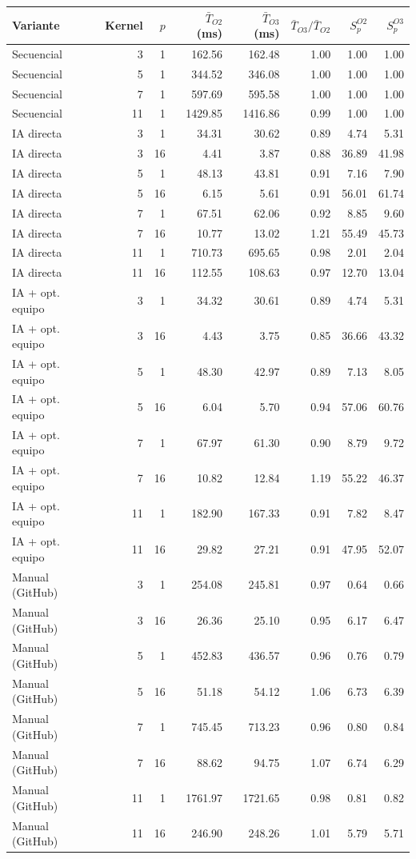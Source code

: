 \begin{tabular}{lrrrrrrr}
\toprule
Variante & Kernel & $p$ & $\bar{T}_{O2}$ (ms) & $\bar{T}_{O3}$ (ms) & $\bar{T}_{O3}/\bar{T}_{O2}$ & $S_p^{O2}$ & $S_p^{O3}$ \\
\midrule
Secuencial & 3 & 1 & 162.56 & 162.48 & 1.00 & 1.00 & 1.00 \\
Secuencial & 5 & 1 & 344.52 & 346.08 & 1.00 & 1.00 & 1.00 \\
Secuencial & 7 & 1 & 597.69 & 595.58 & 1.00 & 1.00 & 1.00 \\
Secuencial & 11 & 1 & 1429.85 & 1416.86 & 0.99 & 1.00 & 1.00 \\
IA directa & 3 & 1 & 34.31 & 30.62 & 0.89 & 4.74 & 5.31 \\
IA directa & 3 & 16 & 4.41 & 3.87 & 0.88 & 36.89 & 41.98 \\
IA directa & 5 & 1 & 48.13 & 43.81 & 0.91 & 7.16 & 7.90 \\
IA directa & 5 & 16 & 6.15 & 5.61 & 0.91 & 56.01 & 61.74 \\
IA directa & 7 & 1 & 67.51 & 62.06 & 0.92 & 8.85 & 9.60 \\
IA directa & 7 & 16 & 10.77 & 13.02 & 1.21 & 55.49 & 45.73 \\
IA directa & 11 & 1 & 710.73 & 695.65 & 0.98 & 2.01 & 2.04 \\
IA directa & 11 & 16 & 112.55 & 108.63 & 0.97 & 12.70 & 13.04 \\
IA + opt. equipo & 3 & 1 & 34.32 & 30.61 & 0.89 & 4.74 & 5.31 \\
IA + opt. equipo & 3 & 16 & 4.43 & 3.75 & 0.85 & 36.66 & 43.32 \\
IA + opt. equipo & 5 & 1 & 48.30 & 42.97 & 0.89 & 7.13 & 8.05 \\
IA + opt. equipo & 5 & 16 & 6.04 & 5.70 & 0.94 & 57.06 & 60.76 \\
IA + opt. equipo & 7 & 1 & 67.97 & 61.30 & 0.90 & 8.79 & 9.72 \\
IA + opt. equipo & 7 & 16 & 10.82 & 12.84 & 1.19 & 55.22 & 46.37 \\
IA + opt. equipo & 11 & 1 & 182.90 & 167.33 & 0.91 & 7.82 & 8.47 \\
IA + opt. equipo & 11 & 16 & 29.82 & 27.21 & 0.91 & 47.95 & 52.07 \\
Manual (GitHub) & 3 & 1 & 254.08 & 245.81 & 0.97 & 0.64 & 0.66 \\
Manual (GitHub) & 3 & 16 & 26.36 & 25.10 & 0.95 & 6.17 & 6.47 \\
Manual (GitHub) & 5 & 1 & 452.83 & 436.57 & 0.96 & 0.76 & 0.79 \\
Manual (GitHub) & 5 & 16 & 51.18 & 54.12 & 1.06 & 6.73 & 6.39 \\
Manual (GitHub) & 7 & 1 & 745.45 & 713.23 & 0.96 & 0.80 & 0.84 \\
Manual (GitHub) & 7 & 16 & 88.62 & 94.75 & 1.07 & 6.74 & 6.29 \\
Manual (GitHub) & 11 & 1 & 1761.97 & 1721.65 & 0.98 & 0.81 & 0.82 \\
Manual (GitHub) & 11 & 16 & 246.90 & 248.26 & 1.01 & 5.79 & 5.71 \\
\bottomrule
\end{tabular}
